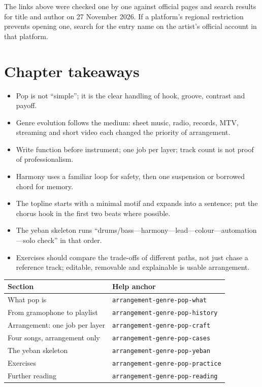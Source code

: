 The links above were checked one by one against official pages and search results for title and author on 27 November 2026. If a platform's regional restriction prevents opening one, search for the entry name on the artist's official account in that platform.

\section{Chapter takeaways}
\label{sec:pop-takeaways}

\begin{itemize}
\item Pop is not ``simple''; it is the clear handling of hook, groove, contrast and payoff.
\item Genre evolution follows the medium: sheet music, radio, records, MTV, streaming and short video each changed the priority of arrangement.
\item Write function before instrument; one job per layer; track count is not proof of professionalism.
\item Harmony uses a familiar loop for safety, then one suspension or borrowed chord for memory.
\item The topline starts with a minimal motif and expands into a sentence; put the chorus hook in the first two beats where possible.
\item The yeban skeleton runs ``drums/bass---harmony---lead---colour---automation---solo check'' in that order.
\item Exercises should compare the trade-offs of different paths, not just chase a reference track; editable, removable and explainable is usable arrangement.
\end{itemize}

\begin{helpmapping}
\begin{longtable}{p{}p{}}
\toprule
Section & Help anchor \\
\midrule
What pop is & \texttt{arrangement-genre-pop-what} \\
From gramophone to playlist & \texttt{arrangement-genre-pop-history} \\
Arrangement: one job per layer & \texttt{arrangement-genre-pop-craft} \\
Four songs, arrangement only & \texttt{arrangement-genre-pop-cases} \\
The yeban skeleton & \texttt{arrangement-genre-pop-yeban} \\
Exercises & \texttt{arrangement-genre-pop-practice} \\
Further reading & \texttt{arrangement-genre-pop-reading} \\
\bottomrule
\end{longtable}
\end{helpmapping}

